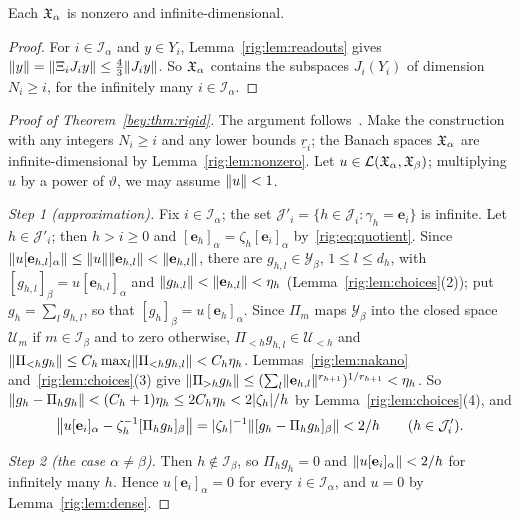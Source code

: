 \begin{lemma}\label{rig:lem:nonzero}
Each $\mathfrak X_\alpha$ is nonzero and infinite-dimensional.
\end{lemma}

\begin{proof}
For $i\in\mathcal I_\alpha$ and $y\in Y_i$, Lemma~\ref{rig:lem:readouts} gives
$\lVert y\rVert=\lVert \Xi_iJ_iy\rVert\le\frac43\lVert J_iy\rVert$. So $\mathfrak X_\alpha$ contains the subspaces $J_i(Y_i)$ of dimension
$N_i\ge i$, for the infinitely many $i\in\mathcal I_\alpha$.
\end{proof}

\begin{proof}[Proof of Theorem~\textup{\ref{bey:thm:rigid}}]
The argument follows~\cite[Theorem~3.6]{KR}. Make the construction with any integers $N_i\ge i$ and any lower bounds
$\underline r_i$; the Banach spaces $\mathfrak X_\alpha$ are infinite-dimensional by Lemma~\ref{rig:lem:nonzero}. Let
$u\in\mathcal L(\mathfrak X_\alpha,\mathfrak X_\beta)$; multiplying $u$ by a power of $\vartheta$, we may assume $\lVert u\rVert<1$.

\emph{Step 1 (approximation).} Fix $i\in\mathcal I_\alpha$; the set $\mathcal J'_i=\{h\in\mathcal J_i:\gamma_h=\mathbf e_i\}$
is infinite. Let $h\in\mathcal J'_i$; then $h>i\ge0$ and $[\mathbf e_h]_\alpha=\zeta_h[\mathbf e_i]_\alpha$
by~\eqref{rig:eq:quotient}. Since $\lVert u[\mathbf e_{h,l}]_\alpha\rVert\le\lVert u\rVert\lVert \mathbf e_{h,l}\rVert<\lVert \mathbf e_{h,l}\rVert$, there are
$g_{h,l}\in\mathcal Y_\beta$, $1\le l\le d_h$, with $[g_{h,l}]_\beta=u[\mathbf e_{h,l}]_\alpha$ and
$\lVert g_{h,l}\rVert<\lVert \mathbf e_{h,l}\rVert<\eta_h$ (Lemma~\ref{rig:lem:choices}(2)); put $g_h=\sum_lg_{h,l}$, so that
$[g_h]_\beta=u[\mathbf e_h]_\alpha$. Since $\Pi_m$ maps $\mathcal Y_\beta$ into the closed space $\mathcal U_m$ if
$m\in\mathcal I_\beta$ and to zero otherwise, $\Pi_{<h}g_{h,l}\in\mathcal U_{<h}$ and
$\lVert \Pi_{<h}g_h\rVert\le C_h\max_l\lVert \Pi_{<h}g_{h,l}\rVert<C_h\eta_h$. Lemmas~\ref{rig:lem:nakano}
and~\ref{rig:lem:choices}(3) give $\lVert \Pi_{>h}g_h\rVert\le(\sum_l\lVert \mathbf e_{h,l}\rVert^{r_{h+1}})^{1/r_{h+1}}<\eta_h$. So
$\lVert g_h-\Pi_hg_h\rVert<(C_h+1)\eta_h\le2C_h\eta_h<2\lvert \zeta_h\rvert/h$ by Lemma~\ref{rig:lem:choices}(4), and
\begin{equation}\label{rig:eq:approx}
 \bigl\lVert u[\mathbf e_i]_\alpha-\zeta_h^{-1}[\Pi_hg_h]_\beta\bigr\rVert
 =\lvert \zeta_h\rvert^{-1}\lVert [g_h-\Pi_hg_h]_\beta\rVert<2/h\qquad(h\in\mathcal J'_i).
\end{equation}

\emph{Step 2 (the case $\alpha\ne\beta$).} Then $h\notin\mathcal I_\beta$, so $\Pi_hg_h=0$ and
$\lVert u[\mathbf e_i]_\alpha\rVert<2/h$ for infinitely many $h$. Hence $u[\mathbf e_i]_\alpha=0$ for every
$i\in\mathcal I_\alpha$, and $u=0$ by Lemma~\ref{rig:lem:dense}.


\end{proof}
